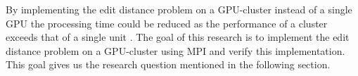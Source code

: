 By implementing the edit distance problem on a GPU-cluster instead of a single GPU the processing time could be reduced as the performance of a cluster exceeds that of a single unit \cite{Cluster}.
The goal of this research is to implement the edit distance problem on a GPU-cluster using MPI and verify this implementation.
This goal gives us the research question mentioned in the following section.

